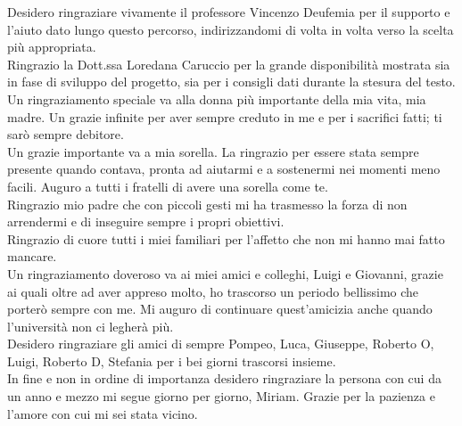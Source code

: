 Desidero ringraziare vivamente il professore Vincenzo Deufemia per il supporto e l'aiuto dato lungo questo percorso, indirizzandomi di volta in volta verso la scelta più appropriata.\\
Ringrazio la Dott.ssa Loredana Caruccio per la grande disponibilità mostrata sia in fase di sviluppo del progetto, sia per i consigli dati durante la stesura del testo.\\
Un ringraziamento speciale va alla donna più importante della mia vita, mia madre. Un grazie infinite per aver sempre creduto in me e per i sacrifici fatti; ti sarò sempre debitore.\\
Un grazie importante va a mia sorella. La ringrazio per essere stata sempre presente quando contava, pronta ad aiutarmi e a sostenermi nei momenti meno facili. Auguro a tutti i fratelli di avere una sorella come te.\\
Ringrazio mio padre che con piccoli gesti mi ha trasmesso la forza di non arrendermi e di inseguire sempre i propri obiettivi.\\
Ringrazio di cuore tutti i miei familiari per l'affetto che non mi hanno mai fatto mancare.\\
Un ringraziamento doveroso va ai miei amici e colleghi, Luigi e Giovanni, grazie ai quali oltre ad aver appreso molto, ho trascorso un periodo bellissimo che porterò sempre con me. Mi auguro di continuare quest'amicizia anche quando l'università non ci legherà più.\\
Desidero ringraziare gli amici di sempre Pompeo, Luca, Giuseppe, Roberto O, Luigi, Roberto D, Stefania per i bei giorni trascorsi insieme.\\
In fine e non in ordine di importanza desidero ringraziare la persona con cui da un anno e mezzo mi segue giorno per giorno, Miriam. Grazie per la pazienza e l'amore con cui mi sei stata vicino.